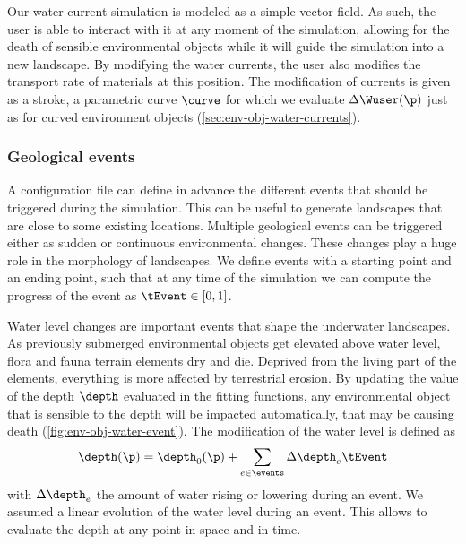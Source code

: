 
Our water current simulation is modeled as a simple vector field. As such, the user is able to interact with it at any moment of the simulation, allowing for the death of sensible environmental objects while it will guide the simulation into a new landscape. By modifying the water currents, the user also modifies the transport rate of materials at this position. The modification of currents is given as a stroke, a parametric curve $\curve$ for which we evaluate $\Delta \Wuser(\p)$ just as for curved environment objects (\cref{sec:env-obj-water-currents}).

\subsubsection{Geological events}
\label{sec:env-obj-events}
A configuration file can define in advance the different events that should be triggered during the simulation. This can be useful to generate landscapes that are close to some existing locations. 
Multiple geological events can be triggered either as sudden or continuous environmental changes. These changes play a huge role in the morphology of landscapes.
We define events with a starting point and an ending point, such that at any time of the simulation we can compute the progress of the event as $\tEvent \in [0, 1]$.

Water level changes are important events that shape the underwater landscapes. As previously submerged environmental objects get elevated above water level, flora and fauna terrain elements dry and die. Deprived from the living part of the elements, everything is more affected by terrestrial erosion. By updating the value of the depth $\depth$ evaluated in the fitting functions, any environmental object that is sensible to the depth will be impacted automatically, that may be causing death (\cref{fig:env-obj-water-event}). The modification of the water level is defined as 
\begin{align*}
    \depth(\p) = \depth_0(\p) + \sum_{e \in \events} \Delta \depth_e \tEvent
\end{align*}
with $\Delta \depth_e$ the amount of water rising or lowering during an event. We assumed a linear evolution of the water level during an event. This allows to evaluate the depth at any point in space and in time.

